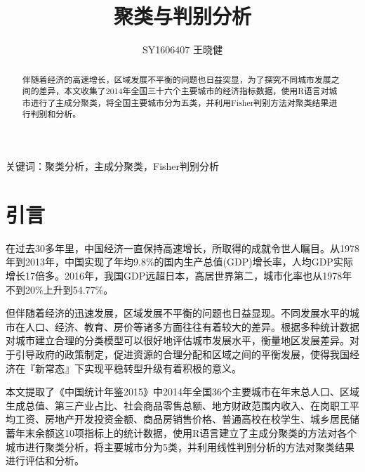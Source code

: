 \documentclass [a4paper]{article}
\author {SY1606407 王晓健}
\title {聚类与判别分析}
\date{}
\begin{document}
\maketitle

\begin{abstract}
伴随着经济的高速增长，区域发展不平衡的问题也日益突显，为了探究不同城市发展之间的差异，本文收集了2014年全国三十六个主要城市的经济指标数据，使用R语言对城市进行了主成分聚类，将全国主要城市分为五类，并利用Fisher判别方法对聚类结果进行判别和分析。
\end{abstract}

\begin{keywords}
关键词：聚类分析，主成分聚类，Fisher判别分析
\end{keywords}

\section{引言}
在过去30多年里，中国经济一直保持高速增长，所取得的成就令世人瞩目。从1978年到2013年，中国实现了年均9.8\%的国内生产总值(GDP)增长率，人均GDP实际增长17倍多。2016年，我国GDP远超日本，高居世界第二，城市化率也从1978年不到20\%上升到54.77\%。

但伴随着经济的迅速发展，区域发展不平衡的问题也日益显现。不同发展水平的城市在人口、经济、教育、房价等诸多方面往往有着较大的差异。根据多种统计数据对城市建立合理的分类模型可以很好地评估城市发展水平，衡量地区发展差异。对于引导政府的政策制定，促进资源的合理分配和区域之间的平衡发展，使得我国经济在『新常态』下实现平稳转型升级有着积极的意义。

本文提取了《中国统计年鉴2015》中2014年全国36个主要城市在年末总人口、区域生成总值、第三产业占比、社会商品零售总额、地方财政范围内收入、在岗职工平均工资、房地产开发投资金额、商品房销售价格、普通高校在校学生、城乡居民储蓄年末余额这10项指标上的统计数据，使用R语言建立了主成分聚类的方法对各个城市进行聚类分析，将主要城市分为5类，并利用线性判别分析的方法对聚类结果进行评估和分析。
\end{document}
